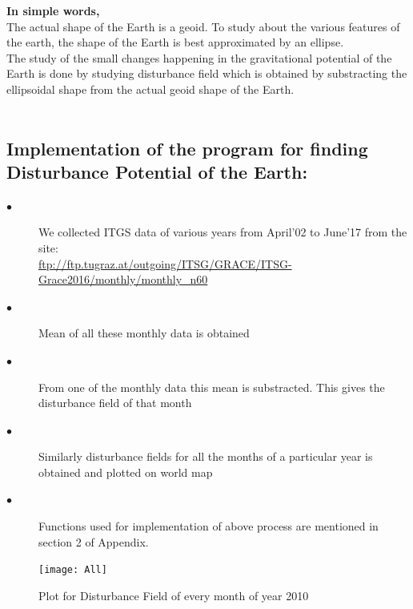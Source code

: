 \documentclass[a4paper,12pt]{report}
\begin{document}
\textbf{In simple words,}
\\The actual shape of the Earth is a geoid. To study about the various features of the earth, the shape of the Earth is best approximated by an ellipse.
\\The study of the small changes happening in the gravitational potential of the Earth is done by studying disturbance field which is obtained by substracting the ellipsoidal shape from the actual geoid shape of the Earth.\\\\


\subsection{Implementation of the program for finding\\Disturbance Potential of the Earth:}
\begin{description}
\item[$\bullet$]We collected ITGS data of various years from April'02 to June'17 from the site:\\
\url{ftp://ftp.tugraz.at/outgoing/ITSG/GRACE/ITSG-Grace2016/monthly/monthly_n60}
\item[$\bullet$]Mean of all these monthly data is obtained
\item[$\bullet$]From one of the monthly data this mean is substracted. This gives the disturbance field of that month
\item[$\bullet$]Similarly disturbance fields for all the months of a particular year is obtained and plotted on world map
\item[$\bullet$]Functions used for implementation of above process are mentioned in section 2 of Appendix.
\end{description}


\begin{figure}
    \advance\leftskip-3cm
    \texttt{[image: All]}
    \caption{Plot for Disturbance Field of every month of year 2010}
\end{figure}
\end{document}

